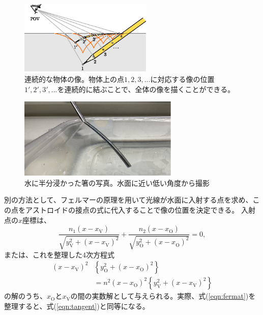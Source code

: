 \documentclass[twocolumn]{article}
\begin{document}
\begin{figure}[h]
	\centering
	\includegraphics*[width=2.5in]{figs/g242.eps}
	\caption{連続的な物体の像。物体上の点$1, 2, 3, ...$に対応する像の位置$1', 2', 3', ...$を連続的に結ぶことで、全体の像を描くことができる。}
	\label{fig:extended_image}
\end{figure}

\begin{figure}[h]
	\centering
	\includegraphics[width=3in]{figs/img_1805_2.eps}
	\caption{水に半分浸かった箸の写真。水面に近い低い角度から撮影}
	\label{fig:picture}
\end{figure}
	
別の方法として、フェルマーの原理を用いて光線が水面に入射する点を求め、この点をアストロイドの接点の式に代入することで像の位置を決定できる。
入射点の$x$座標は、
\[
\dfrac{n_1 \left( x - x_{\mathrm{V}}^{} \right)}{\sqrt{ y_{\mathrm{V}}^2 + \left( x - x_{\mathrm{V}}^{} \right)^2 }}
+\dfrac{n_2 \left( x - x_{\mathrm{O}}^{} \right)}{\sqrt{ y_{\mathrm{O}}^2 + \left( x - x_{\mathrm{O}}^{} \right)^2 }}
= 0,
\]
または、これを整理した4次方程式
\begin{equation} \label{eqn:fermat}
\begin{aligned}
	\left( x - x_{\mathrm{V}}^{} \right)^2 & \left\{ y_{\mathrm{O}}^2 + \left(x - x_{\mathrm{O}}^{} \right)^2 \right\}\\
	&= n^2 \left( x - x_{\mathrm{O}}^{} \right)^2 \left\{ y_{\mathrm{V}}^2 + \left(x - x_{\mathrm{V}}^{} \right)^2 \right\}
\end{aligned}
\end{equation}
の解のうち、$x_{\mathrm{O}}^{}$と$x_{\mathrm{V}}^{}$の間の実数解として与えられる。実際、式(\ref{eqn:fermat})を整理すると、式(\ref{eqn:tangent})と同等になる。
\end{document}
